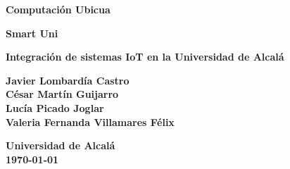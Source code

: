 \documentclass[12pt]{report}
\begin{document}
\begin{titlepage}
    \begin{center}
        \vspace*{1cm}
        
        \textbf{\huge Computación Ubicua}
        
        \vspace{0.5cm}
        \textbf{\large Smart Uni}
        
        \vspace{1.5cm}
        
        \textbf{\huge Integración de sistemas IoT en la Universidad de Alcalá}
        
        \vspace{2cm}
        
        \textbf{\large Javier Lombardía Castro}\\
        \textbf{\large César Martín Guijarro}\\
        \textbf{\large Lucía Picado Joglar }\\
        \textbf{\large Valeria Fernanda Villamares Félix}\\
        
        \vfill
        
        \textbf{\large Universidad de Alcalá}\\
        \textbf{\large \today}
        
    \end{center}
\end{titlepage}


\tableofcontents


\end{document}

